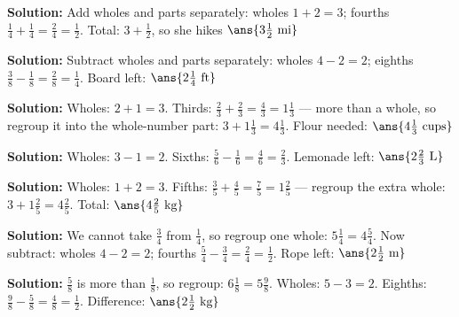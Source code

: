 \documentclass[12pt]{article}
\begin{document}



\textbf{Solution:} Add wholes and parts separately: wholes $1 + 2 = 3$;
fourths $\tfrac{1}{4} + \tfrac{1}{4} = \tfrac{2}{4} = \tfrac{1}{2}$.
Total: $3 + \tfrac{1}{2}$, so she hikes
$\ans{3\tfrac{1}{2}\ \text{mi}}$


\textbf{Solution:} Subtract wholes and parts separately: wholes $4 - 2 = 2$;
eighths $\tfrac{3}{8} - \tfrac{1}{8} = \tfrac{2}{8} = \tfrac{1}{4}$.
Board left: $\ans{2\tfrac{1}{4}\ \text{ft}}$


\textbf{Solution:} Wholes: $2 + 1 = 3$. Thirds:
$\tfrac{2}{3} + \tfrac{2}{3} = \tfrac{4}{3} = 1\tfrac{1}{3}$ --- more than a
whole, so regroup it into the whole-number part: $3 + 1\tfrac{1}{3} =
4\tfrac{1}{3}$. Flour needed: $\ans{4\tfrac{1}{3}\ \text{cups}}$


\textbf{Solution:} Wholes: $3 - 1 = 2$. Sixths:
$\tfrac{5}{6} - \tfrac{1}{6} = \tfrac{4}{6} = \tfrac{2}{3}$.
Lemonade left: $\ans{2\tfrac{2}{3}\ \text{L}}$


\textbf{Solution:} Wholes: $1 + 2 = 3$. Fifths:
$\tfrac{3}{5} + \tfrac{4}{5} = \tfrac{7}{5} = 1\tfrac{2}{5}$ --- regroup the
extra whole: $3 + 1\tfrac{2}{5} = 4\tfrac{2}{5}$. Total:
$\ans{4\tfrac{2}{5}\ \text{kg}}$


\textbf{Solution:} We cannot take $\tfrac{3}{4}$ from $\tfrac{1}{4}$, so
regroup one whole: $5\tfrac{1}{4} = 4\tfrac{5}{4}$. Now subtract: wholes
$4 - 2 = 2$; fourths $\tfrac{5}{4} - \tfrac{3}{4} = \tfrac{2}{4} =
\tfrac{1}{2}$. Rope left: $\ans{2\tfrac{1}{2}\ \text{m}}$


\textbf{Solution:} $\tfrac{5}{8}$ is more than $\tfrac{1}{8}$, so regroup:
$6\tfrac{1}{8} = 5\tfrac{9}{8}$. Wholes: $5 - 3 = 2$. Eighths:
$\tfrac{9}{8} - \tfrac{5}{8} = \tfrac{4}{8} = \tfrac{1}{2}$. Difference:
$\ans{2\tfrac{1}{2}\ \text{kg}}$
\end{document}
